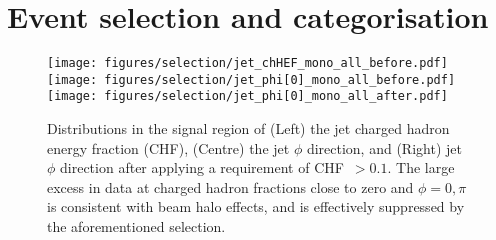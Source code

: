 \section{Event selection and categorisation}
\label{app:selection}

\begin{figure}[h!]
    \begin{center}
        {\texttt{[image: figures/selection/jet\_chHEF\_mono\_all\_before.pdf]}}
        {\texttt{[image: figures/selection/jet\_phi[0]\_mono\_all\_before.pdf]}}
        {\texttt{[image: figures/selection/jet\_phi[0]\_mono\_all\_after.pdf]}}
        \caption{Distributions in the signal region of (Left) the jet
          charged hadron energy fraction (CHF), (Centre) the jet
          $\phi$ direction, and (Right) jet $\phi$ direction after
          applying a requirement of {CHF~$>0.1$}. The large excess in
          data at charged hadron fractions close to zero and ${\phi =
            0, \pi}$ is consistent with beam halo effects, and is
          effectively suppressed by the aforementioned selection.}
        \label{fig:leadJetCleaning}
    \end{center}
\end{figure}

